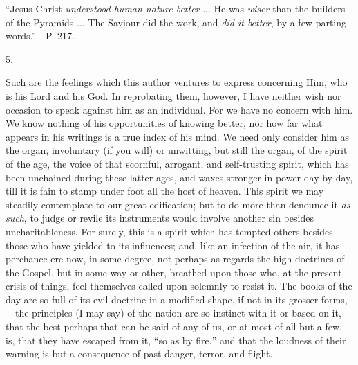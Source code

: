 ``Jesus Christ \emph{understood
human nature better} ... He was \emph{wiser} than the builders of
the Pyramids ... The Saviour did the work, and \emph{did it better},
by a few parting words.''—P. 217.

5.

Such are the feelings which this author ventures
to express concerning Him, who is his Lord and his God. In reprobating
them, however, I have neither wish nor occasion to speak against him
as an individual. For we have no concern with him. We know nothing of
his opportunities of knowing better, nor how far what appears in his
writings is a true index of his mind. We need only consider him as the
organ, involuntary (if you will) or unwitting, but still the organ, of
the spirit of the age, the voice of that scornful, arrogant, and
self-trusting spirit, which has been unchained during these latter
ages, and waxes stronger in power day by day, till it is fain to stamp
under foot all the host of heaven. This spirit we may steadily
contemplate to our great edification; but to do more than denounce it \emph{as
such}, to judge or revile its instruments would involve another sin
besides uncharitableness. For surely, this is a spirit which has
tempted others besides those who have yielded to its influences; and,
like an infection of the air, it has perchance ere now, in some
degree, not perhaps as regards the high doctrines of the Gospel,
but in some way or other, breathed upon those who, at the present
crisis of things, feel themselves called upon solemnly to resist it.
The books of the day are so full of its evil doctrine in a modified
shape, if not in its grosser forms,—the principles (I may say) of
the nation are so instinct with it or based on it,—that the best
perhaps that can be said of any of us, or at most of all but a few,
is, that they have escaped from it, ``so as by fire,'' and that the
loudness of their warning is but a consequence of past danger, terror,
and flight.


